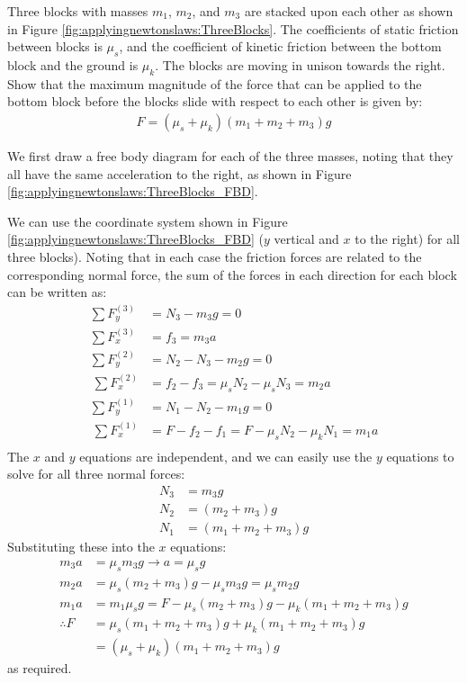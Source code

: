 \question Three blocks with masses $m_1$, $m_2$, and $m_3$ are stacked upon each other as shown in Figure \ref{fig:applyingnewtonslaws:ThreeBlocks}. The coefficients of static friction between blocks is $\mu_s$, and the coefficient of kinetic friction between the bottom block and the ground is $\mu_k$. The blocks are moving in unison towards the right. Show that the maximum magnitude of the force that can be applied to the bottom block before the blocks slide with respect to each other is given by:
\begin{align*}
F=(\mu_s+\mu_k)(m_1+m_2+m_3)g
\end{align*}


\begin{solution}
We first draw a free body diagram for each of the three masses, noting that they all have the same acceleration to the right, as shown in Figure \ref{fig:applyingnewtonslaws:ThreeBlocks_FBD}.

We can use the coordinate system shown in Figure \ref{fig:applyingnewtonslaws:ThreeBlocks_FBD} ($y$ vertical and $x$ to the right) for all three blocks). Noting that in each case the friction forces are related to the corresponding normal force, the sum of the forces in each direction for each block can be written as:
\begin{align*}
\sum F_y^{(3)} &= N_3-m_3g=0 \\
\sum F_x^{(3)} &= f_3 =m_3 a\\
\sum F_y^{(2)} &= N_2-N_3-m_2g=0 \\\
\sum F_x^{(2)} &= f_2-f_3 = \mu_sN_2-\mu_sN_3=m_2 a\\
\sum F_y^{(1)} &= N_1-N_2-m_1g=0 \\\
\sum F_x^{(1)} &= F-f_2-f_1 = F-\mu_sN_2-\mu_kN_1=m_1 a\\
\end{align*}
The $x$ and $y$ equations are independent, and we can easily use the $y$ equations to solve for all three normal forces:
\begin{align*}
N_3 &= m_3g\\
N_2 &= (m_2+m_3)g\\
N_1 &= (m_1+m_2+m_3)g
\end{align*}
Substituting these into the $x$ equations:
\begin{align*}
m_3a &= \mu_sm_3g \to a=\mu_sg\\
m_2a &= \mu_s(m_2+m_3)g-\mu_sm_3g=\mu_sm_2g\\
m_1a &= m_1\mu_sg=F-\mu_s(m_2+m_3)g-\mu_k(m_1+m_2+m_3)g\\
\therefore F &= \mu_s(m_1+m_2+m_3)g+\mu_k(m_1+m_2+m_3)g\\
&=(\mu_s+\mu_k)(m_1+m_2+m_3)g
\end{align*}
as required.
\end{solution}

